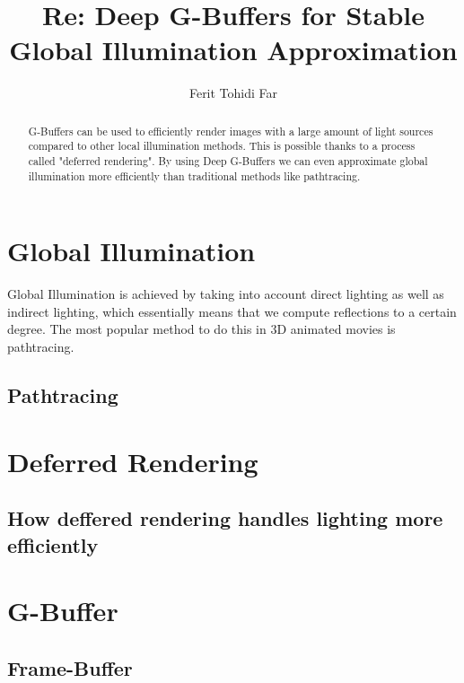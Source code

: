 \documentclass{ACGSeminar}
\begin{document}
\title{Re: Deep G-Buffers for Stable Global Illumination Approximation}

\author{Ferit Tohidi Far}

\maketitle


\begin{abstract}%
G-Buffers can be used to efficiently render images with a large amount of light sources compared to other local illumination methods. This is possible thanks to a 
process called "deferred rendering". By using Deep G-Buffers we can even approximate global illumination more efficiently than traditional methods like pathtracing. 
\end{abstract}

\tableofcontents

\newpage

\label{cha:introduction}
\section{Global Illumination}
	Global Illumination is achieved by taking into account direct lighting as well as indirect lighting, which essentially means that we compute reflections to a
	certain degree. The most popular method to do this in 3D animated movies is pathtracing.
	\subsection{Pathtracing}

\section{Deferred Rendering}
	\subsection{How deffered rendering handles lighting more efficiently}

\section{G-Buffer}
	\subsection{Frame-Buffer}
\end{document}
